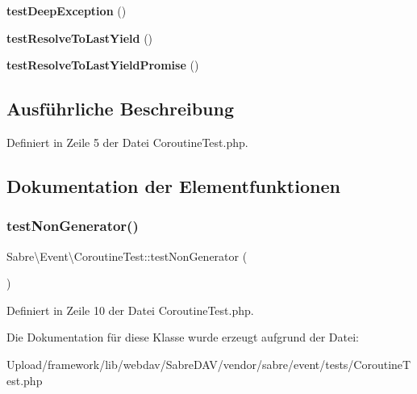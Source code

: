 \begin{DoxyCompactItemize}
\mbox{\label{class_sabre_1_1_event_1_1_coroutine_test_a08bff72fbf3513f8d14ed744bbb15d7c}} 
{\bfseries test\+Deep\+Exception} ()
\item 
\mbox{\label{class_sabre_1_1_event_1_1_coroutine_test_a1bfe8993cac541b5aab272dba7912c39}} 
{\bfseries test\+Resolve\+To\+Last\+Yield} ()
\item 
\mbox{\label{class_sabre_1_1_event_1_1_coroutine_test_ad9a0111352e6de849464e996832dfbbf}} 
{\bfseries test\+Resolve\+To\+Last\+Yield\+Promise} ()
\end{DoxyCompactItemize}


\subsection{Ausführliche Beschreibung}


Definiert in Zeile 5 der Datei Coroutine\+Test.\+php.



\subsection{Dokumentation der Elementfunktionen}
\mbox{\label{class_sabre_1_1_event_1_1_coroutine_test_a0699cbb8213f80cf2810ca1452d99d97}} 
\subsubsection{\texorpdfstring{test\+Non\+Generator()}{testNonGenerator()}}
{\footnotesize\ttfamily Sabre\textbackslash{}\+Event\textbackslash{}\+Coroutine\+Test\+::test\+Non\+Generator (\begin{DoxyParamCaption}{ }\end{DoxyParamCaption})}



Definiert in Zeile 10 der Datei Coroutine\+Test.\+php.



Die Dokumentation für diese Klasse wurde erzeugt aufgrund der Datei\+:\begin{DoxyCompactItemize}
\item 
Upload/framework/lib/webdav/\+Sabre\+D\+A\+V/vendor/sabre/event/tests/Coroutine\+Test.\+php\end{DoxyCompactItemize}
